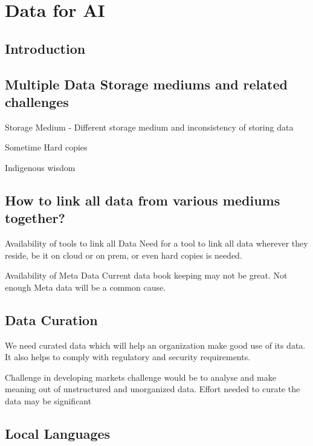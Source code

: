 \chapter {Data for AI}
\label{chap:data_for_ai}
\section{Introduction}\label{sec:data:intro}
\lipsum[2-4]


\section{Multiple Data Storage mediums and related challenges}
\label{sec:data:storage}
\lipsum[2-4]
Storage Medium -  Different storage medium and inconsistency of storing data

Sometime Hard copies 

Indigenous wisdom 

\section{How to link all data from various mediums together?}
\label{sec:data:link}
\lipsum[2-4]
Availability of tools to link all Data
Need for a tool to link all data wherever they reside, be it on cloud or on prem, or even hard copies is needed.

Availability of  Meta Data
Current data book keeping may not be  great. Not enough Meta data will be a common cause.



\section{Data Curation}
\label{sec:data:curation}
\lipsum[2-4]

We need curated data which will help an organization make good use of its data. It also helps to comply with  regulatory and security requirements.

Challenge in developing markets challenge would be to analyse and make meaning out of unstructured and unorganized data.  Effort needed to curate the data may be significant 

\section{Local Languages}
\label{sec:data:language}
\lipsum[2-4]

